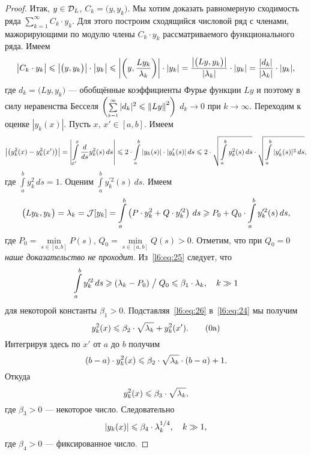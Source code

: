 \begin{proof}
	Итак, $y\in\mathcal{D}_L$, $C_k=\big(y,y_k\big)$. Мы хотим доказать равномерную сходимость ряда $\sum\limits_{k=1}^{\infty}C_k\cdot y_k$. Для этого построим сходящийся числовой ряд	с членами, мажорирующими по модулю члены $C_k\cdot y_k$ рассматриваемого функционального ряда. Имеем
	\begin{equation}
		\label{l6:eq:23}
		\hfill\big|C_k\cdot y_k\big|\leqslant\big|\big(y,y_k\big)\big|\cdot\big|y_k\big|\leqslant\left|\left(y,\frac{Ly_k}{\lambda_k}\right)\right|\cdot|y_k|=\frac{\big|\big(Ly,y_k\big)\big|}{|\lambda_k|}\cdot|y_k|=\frac{|d_k|}{|\lambda_k|}\cdot|y_k|,\hfill
	\end{equation}
	где $d_k=\big(Ly,y_k\big)$ --- обобщённые коэффициенты Фурье функции $Ly$ и поэтому в силу неравенства Бесселя $\left(\scriptstyle\sum\limits_{k=1}^{\infty}\textstyle|d_k|^2\leqslant{\ensuremath{\left\|Ly\right\|}}^2\right)$ $d_k\to0$ при $k\to \infty$. Переходим к оценке $|y_k(x)|$. Пусть $x,\,x'\in[a,b]$. Имеем
	\begin{equation}
		\label{l6:eq:24}
		\big|\big(y_k^2(x)-y_k^2(x')\big)\big|=\left|\int\limits_{x'}^{x}\frac{d}{ds}y_k^2(s)\,ds\right|\leqslant2\cdot\int\limits_a^b|y_k(s)|\cdot|y'_k(s)|\,ds\leqslant2\cdot\sqrt{\int\limits_a^b y_k^2(s)\,ds}\cdot\sqrt{\int\limits_a^b |y'_k(s)|^2\,ds},
	\end{equation} 
	где $\int\limits_a^b y_k^2\,ds=1$. Оценим $\int\limits_a^b y_k^{\prime2}(s)\,ds$. Имеем 
	\begin{equation}
		\label{l6:eq:25}
		\big(Ly_k,y_k\big)=\lambda_k=\mathcal{J}[y_k]=\int\limits_a^b\left(P\cdot y_k^2+Q\cdot y_k^{\prime2}\right)\,ds\geqslant P_0+Q_0\cdot\int\limits_a^b y_k^{\prime2}(s)\,ds,
	\end{equation}
	где $P_0=\min\limits_{s\in[a,b]}P(s)$, $Q_0=\min\limits_{s\in[a,b]}Q(s)>0$. Отметим, что при \emph{$Q_0=0$ наше доказательство не проходит}. Из~\eqref{l6:eq:25} следует, что 
	\begin{equation}
		\label{l6:eq:26}
		\hfill\int\limits_a^b y_k^{\prime2}\,ds\geqslant(\lambda_k-P_0)\bigm/Q_0\leqslant\beta_1\cdot\lambda_k,\quad k\gg1\hfill
	\end{equation}  
	для некоторой константы $\beta_1>0$. Подставляя~\eqref{l6:eq:26} в~\eqref{l6:eq:24} мы получим 
	\begin{equation}
		\label{l6:eq:26a}
		\hfill y_k^2(x)\leqslant\beta_2\cdot\sqrt{\lambda_k}+y_k^2(x').\tag{\theequation a}\hfill
	\end{equation}
	Интегрируя здесь по $x'$ от $a$ до $b$ получим 
	\begin{equation*}
		\hfill(b-a)\cdot y_k^2(x)\leqslant\beta_2\cdot\sqrt{\lambda_k}\cdot(b-a)+1.\hfill
	\end{equation*}
	Откуда 
	\begin{equation*}
		\hfill y_k^2(x)\leqslant\beta_3\cdot\sqrt{\lambda_k},\hfill
	\end{equation*}
	где $\beta_3>0$ --- некоторое число. Следовательно
	\begin{equation}
		\label{l6:eq:27}
		\hfill|y_k(x)|\leqslant\beta_4\cdot\lambda_k^{1/4},\quad k\gg1,\hfill
	\end{equation}
	где $\beta_4>0$ --- фиксированное число.
	

\end{proof}
